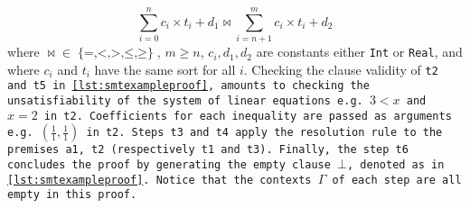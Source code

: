 \begin{equation}
\sum_{i=0}^{n}c_i\times{}t_i + d_1\bowtie \sum_{i=n+1}^{m} c_i\times{}t_i + d_2
\label{eqn:inequality}
\end{equation}
%
where $\mathop{\bowtie} \mathrel{\in} \mathop{\{=, <, >, \leq, \geq\}}$, $m\geq n$, $c_i, d_1, d_2$ are constants either \lstinline[language=SMT,basicstyle=\ttfamily\footnotesize]{Int} or \lstinline[language=SMT,basicstyle=\ttfamily\footnotesize]{Real},
and where $c_i$ and $t_i$ have the same sort for all $i$.
Checking the clause validity of \tt{t2} and \tt{t5} in \cref{lst:smtexampleproof}, amounts to checking the unsatisfiability of the system of linear equations e.g. $3 < x$ and $x = 2$ in \tt{t2}.
Coefficients for each inequality are passed as arguments e.g. $(\frac{1}{1},\frac{1}{1})$ in \tt{t2}.
Steps \tt{t3} and \tt{t4} apply the \colorbox{purple!30}{\texttt{resolution}} rule to the premises \tt{a1}, \tt{t2} (respectively \tt{t1} and \tt{t3}).
Finally, the step \texttt{t6} concludes the proof by generating the empty clause $\bot$, denoted as  in \cref{lst:smtexampleproof}.
Notice that the contexts \colorbox{blue!30}{$\Gamma$} of each step are all empty in this proof.

